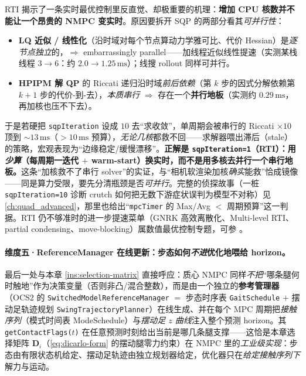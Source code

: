 \begin{insight}\label{ins:mpc-rti}
RTI 揭示了一条实时最优控制里反直觉、却极重要的机理：\textbf{增加 CPU 核数并不能让一个昂贵的 NMPC 变实时}。原因要拆开 SQP 的两部分看其\emph{可并行性}：
\begin{itemize}
  \item \textbf{LQ 近似 / 线性化}（沿时域对每个节点算动力学雅可比、代价 Hessian）是\emph{逐节点独立}的，$\Rightarrow$ embarrassingly parallel——加线程近似线性提速（实测某栈线程 $3\!\to\!6$：约 $2.0\!\to\!1.25\,\mathrm{ms}$）；线搜 rollout 同样可并行。
  \item \textbf{HPIPM 解 QP} 的 Riccati 递归沿时域\emph{前后依赖}（第 $k$ 步的因式分解依赖第 $k\!+\!1$ 步的代价-到-去），\emph{本质串行} $\Rightarrow$ 存在一个\textbf{并行地板}（实测约 $0.29\,\mathrm{ms}$，再加核也压不下去）。
\end{itemize}
于是若硬把 \texttt{sqpIteration} 设成 $10$ 去“求收敛”，单周期会被串行的 Riccati $\times10$ 顶到 $\sim13\,\mathrm{ms}$（$>10\,\mathrm{ms}$ 预算），\emph{无论几核}都救不回——求解器喂出滞后（stale）的策略，宏观表现为“边缘稳定/缓慢漂移”。\textbf{正解是 \texttt{sqpIteration=1}（RTI）：用\emph{少算}（每周期一迭代 $+$ warm-start）换实时，而不是用多核去并行一个串行地板。}这条“加核救不了串行 solver”的实证，与“相机软渲染加核\emph{确实}能救”恰成镜像——同是算力受限，要先分清瓶颈是否\emph{可并行}。完整的侦探故事（一桩 \texttt{sqpIteration=10} 诊断 crutch 如何把无数下游症状误判为模型不对称）见 \cref{ch:quad_advanced}，那里也给出“\texttt{mpcTimer} 的 Max/Avg $<$ 周期预算”这一判据。RTI 仍不够准时的进一步提速菜单（GNRK 高效离散化、Multi-level RTI、partial condensing、move-blocking）属数值最优控制专题，可参 \cite{gros2020linear,frison2020hpipm}。
\end{insight}

\paragraph{维度五·ReferenceManager 在线更新：步态如何\emph{不进}优化地喂给 horizon。}
最后一处与本章 \cref{ins:selection-matrix} 直接呼应：质心 NMPC 同样\emph{不把}“哪条腿何时触地”作为决策变量（否则非凸/混合整数），而是由一个独立的\textbf{参考管理器}（OCS2 的 \texttt{SwitchedModelReferenceManager} $=$ 步态时序表 \texttt{GaitSchedule} $+$ 摆动足轨迹规划 \texttt{SwingTrajectoryPlanner}）在线生成、并在每个 MPC 周期把\emph{接触序列}（模式时间表 ModeSchedule）与\emph{摆动足 $z$ 曲线}注入整个预测 horizon。其 \texttt{getContactFlags($t$)} 在任意预测时刻给出当前是哪几条腿支撑——这恰是本章选择矩阵 $\mathbf{D}_i$（\cref{eq:dicarlo-form} 的摆动腿零力约束）在 NMPC 里的\emph{工业级实现}：步态由有限状态机给定、摆动足轨迹由独立规划器给定，优化器只在\emph{给定接触序列下}解力与运动。

